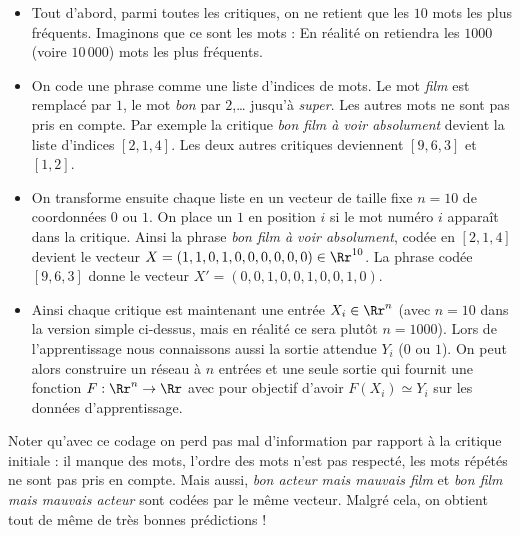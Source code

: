 \documentclass[11pt,class=report,crop=false]{standalone}
\begin{document}
\begin{itemize}
  \item Tout d'abord, parmi toutes les critiques, on ne retient que les $10$ mots les plus fréquents. Imaginons que ce sont les mots :
  En réalité on retiendra les $1000$ (voire $10\,000$) mots les plus fréquents.
  
  
  \item On code une phrase comme une liste d'indices de mots.
  Le mot \og{}\emph{film}\fg{} est remplacé par $1$, le mot \og{}\emph{bon}\fg{} par $2$,\ldots{} jusqu'à  \og{}\emph{super}\fg{}. Les autres mots ne sont pas pris en compte.
  Par exemple la critique \og{}\emph{bon film à voir absolument}\fg{} devient la liste d'indices 
  $[2, 1, 4]$. Les deux autres critiques deviennent $[9, 6, 3]$ et $[1, 2]$.
    
  \item On transforme ensuite chaque liste en un vecteur de taille fixe $n=10$ de coordonnées $0$ ou $1$. On place un $1$ en position $i$ si le mot numéro $i$ apparaît dans la critique.
  Ainsi la phrase \og{}\emph{bon film à voir absolument}\fg{}, codée en $[2, 1, 4]$ devient le vecteur
  $X = (1, 1, 0, 1, 0, 0, 0, 0, 0, 0) \in \Rr^{10}$.
  La phrase codée $[9, 6, 3]$ donne le vecteur $X'=(0, 0, 1, 0, 0, 1, 0, 0, 1, 0)$.
  

   
  \item Ainsi chaque critique est maintenant une entrée $X_i \in \Rr^n$ (avec $n=10$ dans la version simple ci-dessus, mais en réalité ce sera plutôt $n=1000$). Lors de l'apprentissage nous connaissons aussi la sortie attendue $Y_i$ ($0$ ou $1$). On peut alors construire un réseau à $n$ entrées et une seule sortie qui fournit une fonction $F : \Rr^n \to \Rr$ avec pour objectif d'avoir
  $F(X_i) \simeq Y_i$ sur les données d'apprentissage.
  
\end{itemize}

Noter qu'avec ce codage on perd pas mal d'information par rapport à la critique initiale : il manque des mots, l'ordre des mots n'est pas respecté, les mots répétés ne sont pas pris en compte. Mais aussi, \og{}\emph{bon acteur mais mauvais film}\fg{} et \og{}\emph{bon film mais mauvais acteur}\fg{} sont codées par le même vecteur. Malgré cela, on obtient tout de même de très bonnes prédictions !
 
\end{document}
